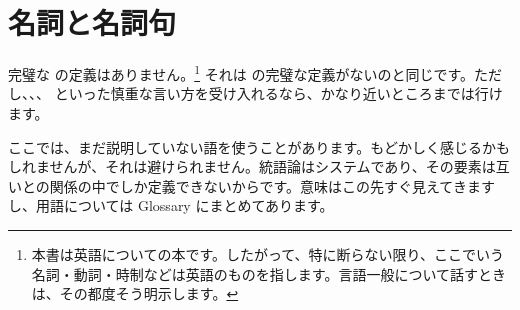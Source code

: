 \section{名詞と名詞句}\label{sec:nouns}

完璧な  の定義はありません。\footnote{本書は英語についての本です。したがって、特に断らない限り、ここでいう名詞・動詞・時制などは英語のものを指します。言語一般について話すときは、その都度そう明示します。} それは  の完璧な定義がないのと同じです。ただし、、、 といった慎重な言い方を受け入れるなら、かなり近いところまでは行けます。

ここでは、まだ説明していない語を使うことがあります。もどかしく感じるかもしれませんが、それは避けられません。統語論はシステムであり、その要素は互いとの関係の中でしか定義できないからです。意味はこの先すぐ見えてきますし、用語については Glossary にまとめてあります。

